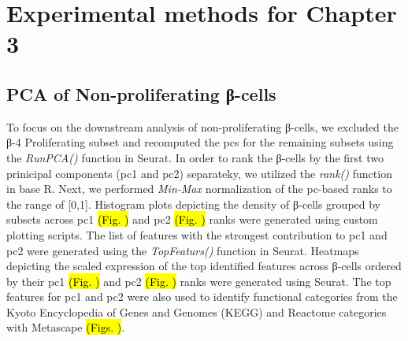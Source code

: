 \section{Experimental methods for Chapter 3}

\subsection{PCA of Non-proliferating β-cells}
To focus on the downstream analysis of non-proliferating β-cells, we excluded the β-4 Proliferating subset and recomputed the \glspl{pc} for the remaining subsets using the \textit{RunPCA()} function in Seurat. In order to rank the β-cells by the first two prinicipal components (\gls{pc}1 and \gls{pc}2) separateky, we utilized the \textit{rank()} function in base R. Next, we performed \textit{Min-Max} normalization of the \gls{pc}-based ranks to the range of [0,1]. Histogram plots depicting the density of β-cells grouped by subsets across \gls{pc}1 \hl{(Fig. )} and \gls{pc}2 \hl{(Fig. )} ranks were generated using custom plotting scripts. The list of features with the strongest contribution to  \gls{pc}1 and \gls{pc}2 were generated using the \textit{TopFeaturs()} function in Seurat. Heatmaps depicting the scaled expression of the top identified features across β-cells ordered by their \gls{pc}1 \hl{(Fig. )} and \gls{pc}2 \hl{(Fig. )} ranks were generated using Seurat. The top features for \gls{pc}1 and \gls{pc}2 were also used to identify functional categories from the Kyoto Encyclopedia of Genes and Genomes (KEGG) and Reactome categories with Metascape \hl{(Figs. )}.  





